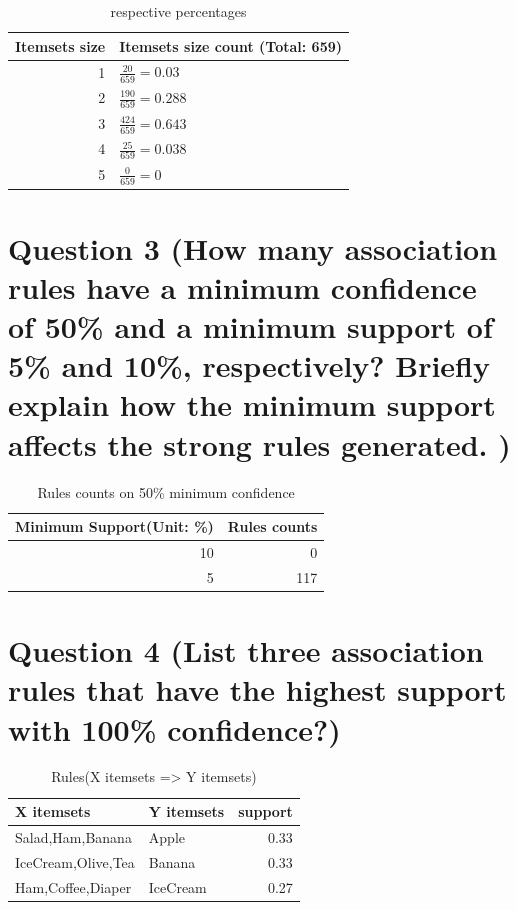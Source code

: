 \documentclass[titlepage]{article}
\begin{document}
\begin{table}[htbp]
\caption{\label{tab:org224342a}
respective percentages}
\centering
\begin{tabular}{rl}
Itemsets size & Itemsets size count (Total: 659)\\
\hline
1 & \(\frac{20}{659} = 0.03\)\\
2 & \(\frac{190}{659} = 0.288\)\\
3 & \(\frac{424}{659} = 0.643\)\\
4 & \(\frac{25}{659} = 0.038\)\\
5 & \(\frac{0}{659} = 0\)\\
\end{tabular}
\end{table}
\section{Question 3 (How many association rules have a minimum confidence of 50\% and a minimum support of 5\% and 10\%, respectively? Briefly explain how the minimum support affects the strong rules generated. )}
\label{sec:org5fe8d9d}

\begin{table}[htbp]
\caption{\label{tab:org5961def}
Rules counts on 50\% minimum confidence}
\centering
\begin{tabular}{rr}
Minimum Support(Unit: \%) & Rules counts\\
\hline
10 & 0\\
5 & 117\\
\end{tabular}
\end{table}

\section{Question 4 (List three association rules that have the highest support with 100\% confidence?)}
\label{sec:org3db3d09}

\begin{table}[htbp]
\caption{\label{tab:org77e45c1}
Rules(X itemsets => Y itemsets)}
\centering
\begin{tabular}{llr}
X itemsets & Y itemsets & support\\
\hline
Salad,Ham,Banana & Apple & 0.33\\
IceCream,Olive,Tea & Banana & 0.33\\
Ham,Coffee,Diaper & IceCream & 0.27\\
\end{tabular}
\end{table}
\end{document}
